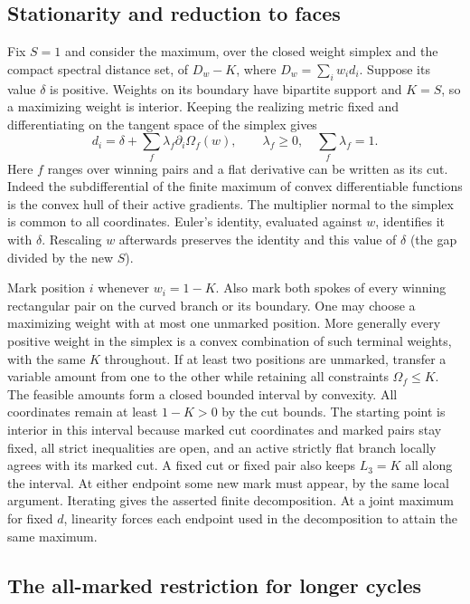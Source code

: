 \documentclass[11pt,a4paper]{article}
\theoremstyle{definition}
\begin{document}
\subsection{Stationarity and reduction to faces}

Fix $S=1$ and consider the maximum, over the closed weight simplex and the
compact spectral distance set, of $D_w-K$, where $D_w=\sum_iw_i d_i$.
Suppose its value $\delta$ is positive. Weights on its boundary have
bipartite support and $K=S$, so a maximizing weight is interior. Keeping
the realizing metric fixed and differentiating on the tangent space of
the simplex gives
\begin{equation}\label{eq:global-normal}
 d_i=\delta+\sum_f\lambda_f\partial_i\Omega_f(w),
 \qquad \lambda_f\ge0,\quad\sum_f\lambda_f=1 .
\end{equation}
Here $f$ ranges over winning pairs and a flat derivative can be written
as its cut. Indeed the subdifferential of the finite maximum of convex
differentiable functions is the convex hull of their active gradients.
The multiplier normal to the simplex is common to all coordinates.
Euler's identity, evaluated against $w$, identifies it with $\delta$.
Rescaling $w$ afterwards preserves the identity and this value of
$\delta$ (the gap divided by the new $S$).

Mark position $i$ whenever $w_i=1-K$. Also mark both spokes of every
winning rectangular pair on the curved branch or its boundary. One may
choose a maximizing weight with at most one unmarked position. More
generally every positive weight in the simplex is a convex combination
of such terminal weights, with the same $K$ throughout. If at least two
positions are unmarked, transfer a variable amount from one to the other
while retaining all constraints $\Omega_f\le K$. The feasible amounts
form a closed bounded interval by convexity. All coordinates remain at
least $1-K>0$ by the cut bounds. The starting point is interior in this
interval because marked cut coordinates and marked pairs stay fixed, all strict
inequalities are open, and an active strictly flat branch locally agrees
with its marked cut. A fixed cut or fixed pair also keeps $L_3=K$ all
along the interval. At either endpoint some new mark must appear, by the
same local argument. Iterating gives the asserted finite decomposition.
At a joint maximum for fixed $d$, linearity forces each endpoint used in
the decomposition to attain the same maximum.

\subsection{The all-marked restriction for longer cycles}
\end{document}
